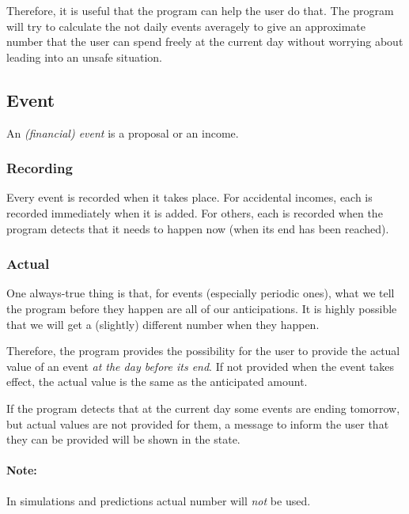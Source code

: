 Therefore, it is useful that the program can help the user do that. The program will try to calculate the not daily events averagely to give an approximate number that the user can spend freely at the current day without worrying about leading into an unsafe situation.

\subsection{Event}
An \emph{(financial) event} is a proposal or an income.

\subsubsection{Recording}
Every event is recorded when it takes place. For accidental incomes, each is recorded immediately when it is added. For others, each is recorded when the program detects that it needs to happen now (when its end has been reached).

\subsubsection{Actual}
One always-true thing is that, for events (especially periodic ones), what we tell the program before they happen are all of our anticipations. It is highly possible that we will get a (slightly) different number when they happen. 

Therefore, the program provides the possibility for the user to provide the actual value of an event \emph{at the day before its end}. If not provided when the event takes effect, the actual value is the same as the anticipated amount.

If the program detects that at the current day some events are ending tomorrow, but actual values are not provided for them, a message to inform the user that they can be provided will be shown in the state.

\paragraph{Note:} In simulations and predictions actual number will \emph{not} be used.

